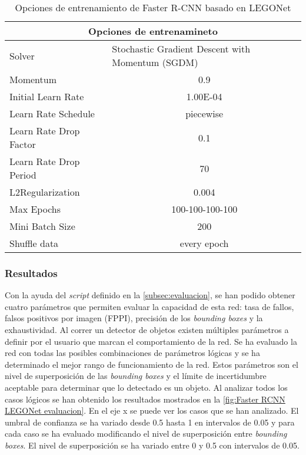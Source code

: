 \begin{table}[ht]
  \centering
    \begin{tabular}{|l|c|}
    \hline
    \multicolumn{2}{|c|}{Opciones de entrenamineto} \\
    \hline
    Solver & \multicolumn{1}{l|}{Stochastic Gradient Descent with Momentum (SGDM)} \\
    \hline
    Momentum & 0.9 \\
    \hline
    Initial Learn Rate & 1.00E-04 \\
    \hline
    Learn Rate Schedule & piecewise \\
    \hline
    Learn Rate Drop Factor & 0.1 \\
    \hline
    Learn Rate Drop Period & 70 \\
    \hline
    L2Regularization & 0.004 \\
    \hline
    Max Epochs & 100-100-100-100 \\
    \hline
    Mini Batch Size & 200 \\
    \hline
    Shuffle data & every epoch \\
    \hline
    \end{tabular}%
  \caption{Opciones de entrenamiento de Faster R-CNN basado en LEGONet}
  \label{tab:Faster RCNN LEGONet options}%
\end{table}%


\subsubsection*{Resultados}
Con la ayuda del \textit{script} definido en la \autoref{subsec:evaluacion}, se han podido obtener cuatro parámetros que permiten evaluar la capacidad de esta red: tasa de fallos, falsos positivos por imagen (FPPI), precisión de los \textit{bounding boxes} y la exhaustividad. Al correr un detector de objetos existen múltiples parámetros a definir por el usuario que marcan el comportamiento de la red. Se ha evaluado la red con todas las posibles combinaciones de parámetros lógicas y se ha determinado el mejor rango de funcionamiento de la red. Estos parámetros son el nivel de superposición de las \textit{bounding boxes} y el límite de incertidumbre aceptable para determinar que lo detectado es un objeto. Al analizar todos los casos lógicos se han obtenido los resultados mostrados en la \autoref{fig:Faster RCNN LEGONet evaluacion}. En el eje x se puede ver los casos que se han analizado. El umbral de confianza se ha variado desde 0.5 hasta 1 en intervalos de 0.05 y para cada caso se ha evaluado modificando el nivel de superposición entre \textit{bounding boxes}. El nivel de superposición se ha variado entre 0 y 0.5 con intervalos de 0.05.

